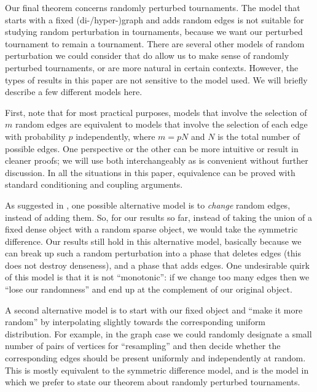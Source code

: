 \documentclass[11pt,english]{article}
\theoremstyle{plain}
\theoremstyle{definition}
\theoremstyle{definition}
\theoremstyle{plain}
\theoremstyle{plain}
\theoremstyle{plain}
\theoremstyle{plain}
\theoremstyle{remark}
\theoremstyle{remark}
\begin{document}
Our final theorem concerns randomly perturbed tournaments. The model
that starts with a fixed \mbox{(di-/hyper-)}graph and adds random
edges is not suitable for studying random perturbation in tournaments,
because we want our perturbed tournament to remain a tournament. There
are several other models of random perturbation we could consider
that do allow us to make sense of randomly perturbed tournaments,
or are more natural in certain contexts. However, the types of results
in this paper are not sensitive to the model used. We will briefly
describe a few different models here.

First, note that for most practical purposes, models that involve
the selection of $m$ random edges are equivalent to models that involve
the selection of each edge with probability $p$ independently, where
$m=pN$ and $N$ is the total number of possible edges. One perspective or the other can be more intuitive
or result in cleaner proofs; we will use both interchangeably as is
convenient without further discussion. In all the situations in this
paper, equivalence can be proved with standard conditioning and coupling
arguments.

As suggested in \cite[Definition~1]{ST03}, one possible alternative
model is to \emph{change} random edges, instead of adding them. So,
for our results so far, instead of taking the union of a fixed dense
object with a random sparse object, we would take the symmetric difference.
Our results still hold in this alternative model, basically because
we can break up such a random perturbation into a phase that deletes
edges (this does not destroy denseness), and a phase that adds edges.
One undesirable quirk of this model is that it is not ``monotonic'':
if we change too many edges then we ``lose our randomness'' and
end up at the complement of our original object.

A second alternative model is to start with our fixed object and ``make
it more random'' by interpolating slightly towards the corresponding
uniform distribution. For example, in the graph case we could randomly
designate a small number of pairs of vertices for ``resampling''
and then decide whether the corresponding edges should be present
uniformly and independently at random. This is mostly equivalent to
the symmetric difference model, and is the model in which we prefer
to state our theorem about randomly perturbed tournaments.
\end{document}
